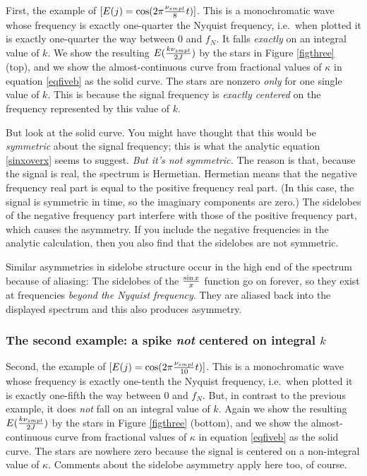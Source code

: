 \documentclass[preprint]{aastex}
\begin{document}
	First, the example of $[E(j) = \cos(2 \pi {\nu_{smpl} \over 8}
t)]$. This is a monochromatic wave whose frequency is exactly
one-quarter the Nyquist frequency, i.e.\ when plotted it is exactly
one-quarter the way between 0 and $f_N$. It falls {\it exactly} on an
integral  value of $k$. We show the resulting $E({k \nu_{smpl} \over
2J})$ by the stars in Figure \ref{figthree} (top), and we show the
almost-continuous curve from fractional values of $\kappa$ in equation
\ref{eqfiveb} as the solid curve. The stars are nonzero {\it only} for
one single value of $k$. This is because the signal frequency is {\it
exactly centered} on the frequency represented by this value of $k$. 

	But look at the solid curve. You might have thought that this
would be {\it symmetric} about the signal frequency; this is what the
analytic equation \ref{sinxoverx} seems to suggest. {\it But it's not
symmetric.} The reason is that, because the signal is real, the spectrum
is Hermetian. Hermetian means that the negative frequency real part is
equal to the positive frequency real part. (In this case, the signal is
symmetric in time, so the imaginary components are zero.) The sidelobes
of the negative frequency part interfere with those of the positive
frequency part, which causes the asymmetry. If you include the negative
frequencies in the analytic calculation, then you also find that the
sidelobes are not symmetric. 

	Similar asymmetries in sidelobe structure occur in the high end
of the spectrum because of aliasing: The sidelobes of the $\sin x \over
x$ function go on forever, so they exist at frequencies {\it beyond the
Nyquist frequency}. They are aliased back into the displayed spectrum
and this also produces asymmetry.

\subsubsection{The second example: a spike {\it not} centered on
integral $k$}

	Second, the example of $[E(j) = \cos(2 \pi {\nu_{smpl} \over 10}
t)]$. This is a monochromatic wave whose frequency is exactly one-tenth
the Nyquist frequency, i.e.\ when plotted it is exactly one-fifth the
way between 0 and $f_N$. But, in contrast to the previous example, it
does {\it not} fall on an integral value of $k$. Again we show the
resulting $E({k \nu_{smpl} \over 2J})$ by the stars in Figure
\ref{figthree} (bottom), and we show the almost-continuous curve from
fractional values of $\kappa$ in equation \ref{eqfiveb} as the solid
curve. The stars are nowhere zero because the signal is centered on a
non-integral value of $\kappa$. Comments about the sidelobe asymmetry
apply here too, of course. 
\end{document}
